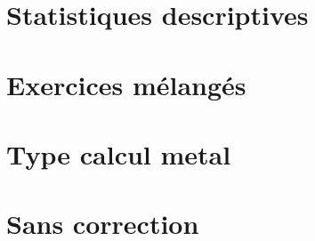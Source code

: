 \section{Statistiques descriptives}


\section{Exercices mélangés}


\section{Type calcul metal}


\section{Sans correction}

